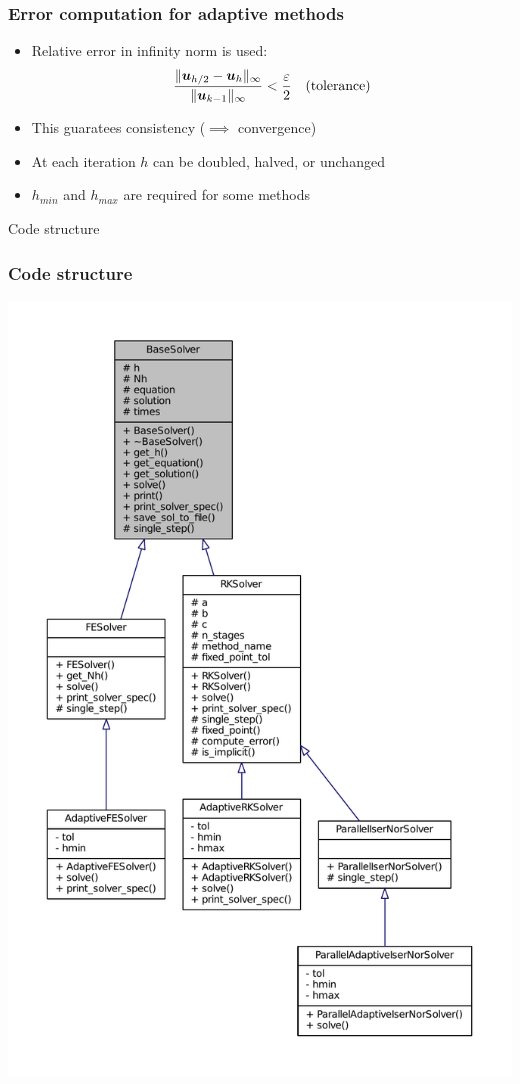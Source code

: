 \documentclass{beamer}
\begin{document}
\begin{frame} %
	\frametitle{Error computation for adaptive methods}
	\begin{itemize}
		\item Relative error in infinity norm is used:
		$$\frac{\lVert\boldsymbol u_{h/2}-\boldsymbol u_h\rVert_\infty}{\lVert\boldsymbol u_{k-1}\rVert_\infty} <
		\frac{\varepsilon}{2} \quad \text{(tolerance)}$$
		\item This guaratees consistency ($\implies$ convergence)
		\pause
		\item At each iteration $h$ can be doubled, halved, or unchanged
		\item $h_{min}$ and $h_{max}$ are required for some methods
	\end{itemize}
\end{frame}


\begin{frame}[c] %
\begin{center}
	\Huge \color{blue} Code structure
\end{center}
\end{frame}


\begin{frame} %
	\frametitle{Code structure}
	\begin{center}
		\includegraphics[width=0.45 \linewidth]{etc/classes_full.pdf}
	\end{center}
\end{frame}
\end{document}
